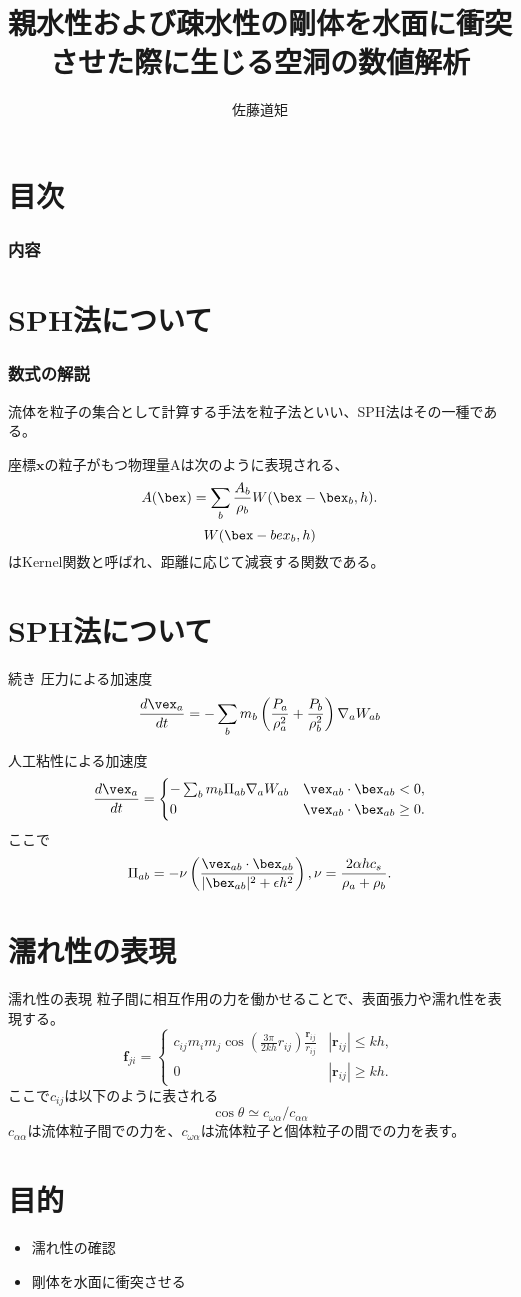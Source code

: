 \documentclass[dvipdfmx,12pt]{beamer}
\title{親水性および疎水性の剛体を水面に衝突させた際に生じる空洞の数値解析}
\author{佐藤道矩}
\institute[京都大学大学院]{流体物理学研究室}
\begin{document}
\begin{frame}\frametitle{}
\titlepage
\end{frame}

\section{目次}
\begin{frame}\frametitle{内容}
\tableofcontents
\end{frame}

\section{SPH法について}
\begin{frame}\frametitle{数式の解説}
  流体を粒子の集合として計算する手法を粒子法といい、SPH法はその一種である。
  
  座標$\bm{x}$の粒子がもつ物理量Aは次のように表現される、
  \[A(\bex)=\sum_b \frac{A_b}{\rho_b} W(\bex-\bex_b,h).\]
  \[W(\bex-bex_b, h)\]はKernel関数と呼ばれ、距離に応じて減衰する関数である。
\end{frame}


\section{SPH法について}
\begin{frame}{続き}
圧力による加速度
\[\frac{d\vex_a}{dt}=-\sum_bm_b\left(\frac{P_a}{\rho_a^2}+\frac{P_b}{\rho_b^2}\right)\nabla_aW_{ab}\]

人工粘性による加速度
\[\frac{d\vex_a}{dt}=\begin{cases}
  -\sum_bm_b\Pi_{ab}\nabla_aW_{ab} & \vex_{ab}\cdot\bex_{ab}<0, \\
  0 & \vex_{ab}\cdot\bex_{ab}\geq0.
\end{cases}
\]
ここで
\[\Pi_{ab}=-\nu\left(\frac{\vex_{ab}\cdot\bex_{ab}}{|\bex_{ab}|^2+\epsilon h^2}\right),
  \nu=\frac{2\alpha h c_s}{\rho_a+\rho_b}.\]
\end{frame}

\section{濡れ性の表現}
\begin{frame}{濡れ性の表現}
粒子間に相互作用の力を働かせることで、表面張力や濡れ性を表現する。
\[  \bm{f}_{ji}=\begin{cases}
    c_{ij}m_im_j\cos\left(\frac{3\pi}{2kh}r_{ij}\right)\frac{\bm{r}_{ij}}{r_{ij}} & \text{$|\bm{r}_{ij}|\leq kh,$}\\
    0 & \text{$|\bm{r}_{ij}|\geq kh.$}
  \end{cases}\]
ここで$c_{ij}$は以下のように表される
\[ \cos\theta\simeq c_{\omega\alpha}/c_{\alpha\alpha}\]
$c_{\alpha\alpha}$は流体粒子間での力を、$c_{\omega\alpha}$は流体粒子と個体粒子の間での力を表す。

\end{frame}
\section{目的}
\begin{itemize}
\item 濡れ性の確認
\item 剛体を水面に衝突させる
\end{itemize}
\end{document}
